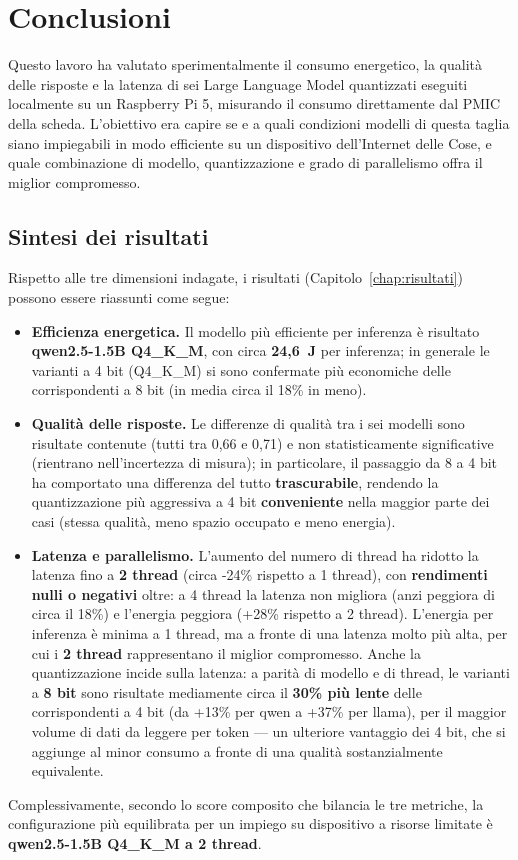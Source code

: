 \chapter{Conclusioni}

Questo lavoro ha valutato sperimentalmente il consumo energetico, la qualità
delle risposte e la latenza di sei Large Language Model quantizzati eseguiti
localmente su un Raspberry Pi 5, misurando il consumo direttamente dal PMIC della
scheda. L'obiettivo era capire se e a quali condizioni modelli di questa taglia
siano impiegabili in modo efficiente su un dispositivo dell'Internet delle Cose,
e quale combinazione di modello, quantizzazione e grado di parallelismo offra il
miglior compromesso.

\section{Sintesi dei risultati}

Rispetto alle tre dimensioni indagate, i risultati (Capitolo~\ref{chap:risultati})
possono essere riassunti come segue:
\begin{itemize}
    \item \textbf{Efficienza energetica.} Il modello più efficiente per inferenza
    è risultato \textbf{qwen2.5-1.5B Q4\_K\_M}, con circa \textbf{24,6~J} per
    inferenza; in generale le varianti a 4 bit (Q4\_K\_M) si sono confermate più
    economiche delle corrispondenti a 8 bit (in media circa il 18\% in meno).
    \item \textbf{Qualità delle risposte.} Le differenze di qualità tra i sei
    modelli sono risultate contenute (tutti tra 0,66 e 0,71) e non statisticamente
    significative (rientrano nell'incertezza di misura); in particolare, il passaggio
    da 8 a 4 bit ha comportato una differenza del tutto \textbf{trascurabile}, rendendo la
    quantizzazione più aggressiva a 4 bit \textbf{conveniente} nella maggior parte
    dei casi (stessa qualità, meno spazio occupato e meno energia).
    \item \textbf{Latenza e parallelismo.} L'aumento del numero di thread ha
    ridotto la latenza fino a \textbf{2 thread} (circa \mbox{-24\%} rispetto a 1
    thread), con \textbf{rendimenti nulli o negativi} oltre: a 4 thread la latenza
    non migliora (anzi peggiora di circa il 18\%) e l'energia peggiora
    (\mbox{+28\%} rispetto a 2 thread). L'energia per inferenza è minima a 1 thread,
    ma a fronte di una latenza molto più alta, per cui i \textbf{2 thread}
    rappresentano il miglior compromesso. Anche la quantizzazione incide sulla
    latenza: a parità di modello e di thread, le varianti a \textbf{8 bit} sono
    risultate mediamente circa il \textbf{30\% più lente} delle corrispondenti a 4
    bit (da \mbox{+13\%} per qwen a \mbox{+37\%} per llama), per il maggior volume di
    dati da leggere per token --- un ulteriore vantaggio dei 4 bit, che si aggiunge
    al minor consumo a fronte di una qualità sostanzialmente equivalente.
\end{itemize}
Complessivamente, secondo lo score composito che bilancia le tre metriche, la
configurazione più equilibrata per un impiego su dispositivo a risorse limitate è
\textbf{qwen2.5-1.5B Q4\_K\_M a 2 thread}.

